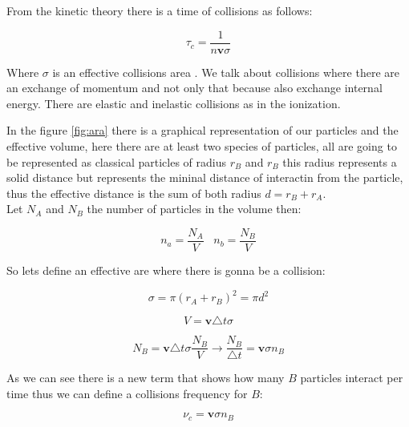 \documentclass[spanish,notitlepage,letterpaper,11pt]{article} %
\numberwithin{equation}{subsection}
\begin{document}
            From the kinetic theory there is a time of  collisions as follows:

            \begin{equation}
                \tau_c = \frac{1}{n\mathbf{v}\sigma}
            \end{equation}

            Where $\sigma$ is an effective collisions area . We talk about collisions where there are an exchange of momentum and not only that because also exchange internal energy. There are elastic and inelastic collisions as in the ionization.

            In the figure \ref{fig:ara} there is a graphical representation of our particles and the effective volume, here there are at least two species of particles, all are going to be represented as classical particles of radius $r_B$ and $r_B$ this radius represents a solid distance but represents the mininal distance of interactin from the particle, thus the effective distance is the sum of both radius $d = r_B + r_A$.\\

            Let $N_A$ and $N_B$ the number of particles in the volume then:

            \begin{equation*}
                n_a = \frac{N_A}{V} \;\;\; n_b = \frac{N_B}{V}
            \end{equation*}

            So lets define an effective are where there is gonna be a collision:

            \begin{equation}
                \sigma = \pi(r_A + r_B)^2 = \pi d^2
            \end{equation}

            \begin{equation}
                V = \mathbf{v} \triangle t \sigma
            \end{equation}

            \begin{equation*}
                N_B = \mathbf{v}\triangle t \sigma \frac{N_B}{V} \rightarrow \frac{N_B}{\triangle t} = \mathbf{v}\sigma n_B
            \end{equation*}

            As we can see there is a new term that shows how many $B$ particles interact per time thus we can define a collisions frequency for $B$:

            \begin{equation}
                \nu_c = \mathbf{v}\sigma n_B
            \end{equation}
\end{document}
